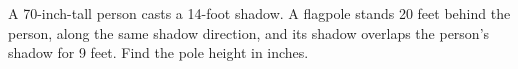 A 70-inch-tall person casts a 14-foot shadow. A flagpole stands 20 feet behind the person, along the same shadow direction, and its shadow overlaps the person's shadow for 9 feet. Find the pole height in inches.
